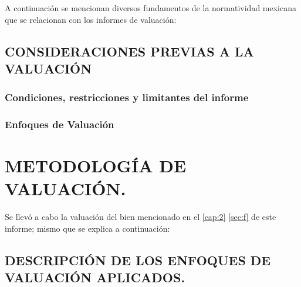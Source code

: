 \documentclass[10pt,letter]{report}
\begin{document}
\begin{enumerate}[a.]
A continuaci\'on se mencionan diversos fundamentos de la normatividad mexicana que se relacionan con los informes de valuaci\'on:\\


\newpage




\espacio{1cm}

\section{CONSIDERACIONES PREVIAS A LA VALUACI\'ON}\label{sec:j}

	\subsection{Condiciones, restricciones y limitantes del informe}
	
	
	
	
	\subsection{Enfoques de Valuaci\'on}
	

\espacio{7cm}
	
	
	\begin{center}
 	\printnoidxglossary[type=\acronymtype,title={Acr\'onimos}]
	\printnoidxglossary
	\end{center}
	
	
\chapter{METODOLOG\'IA DE VALUACI\'ON.}\label{cap:4}
\thispagestyle{fancy}

Se llev\'o a cabo la valuaci\'on del bien mencionado en el \autoref{cap:2}  \autoref{sec:f} de este informe; mismo que se explica a continuaci\'on:

\setcounter{section}{10}
\section{DESCRIPCI\'ON DE LOS ENFOQUES DE VALUACI\'ON APLICADOS.}\label{sec:k}


\end{enumerate}
\end{document}
